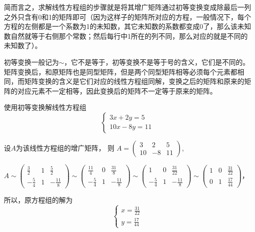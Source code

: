简而言之，求解线性方程组的步骤就是将其增广矩阵通过初等变换变成除最后一列之外只含有0和1的矩阵即可（因为这样子的矩阵所对应的方程，一般情况下，每个方程的左侧都是一个系数为1的未知数，其它未知数的系数都变成0了，那么该未知数自然就等于右侧那个常数；然后每行中1所在的列不同，那么对应的就是不同的未知数了）。

初等变换一般记为$\sim$，它不是等于，初等变换不是等于号的含义，它们是不同的。矩阵变换后，和原矩阵也是同型矩阵，但是两个同型矩阵相等必须每个元素都相同，而矩阵变换的含义是它们对应的线性方程组同解，变换之后的矩阵和原来的矩阵的对应元素不一定相等，因此变换后的矩阵不一定等于原来的矩阵。

\begin{example}
    使用初等变换解线性方程组
    \begin{equation}
        \begin{cases}
            3x+2y=5 \\
            10x-8y=11
        \end{cases}
    \end{equation}
\end{example}
\begin{solution}
    设$A$为该线性方程组的增广矩阵，
    则
    $A= \begin{pmatrix}
        3 & 2 & 5 \\ 
        10 & -8 & 11 
    \end{pmatrix}$,

    $A \sim
    \begin{pmatrix}
        \frac{3}{2} & 1 & \frac{5}{2} \\ 
        -\frac{5}{4} & 1 & -\frac{11}{8} 
    \end{pmatrix}
    \sim
    \begin{pmatrix}
        \frac{11}{4} & 0 & \frac{31}{8} \\ 
        -\frac{5}{4} & 1 & -\frac{11}{8} 
    \end{pmatrix}
    \sim
    \begin{pmatrix}
        1 & 0 & \frac{31}{22} \\ 
        -\frac{5}{4} & 1 & -\frac{11}{8} 
    \end{pmatrix}
    \sim
    \begin{pmatrix}
        1 & 0 & \frac{31}{22} \\ 
        0 & 1 & \frac{17}{44} 
    \end{pmatrix}
    $，
    
    所以，原方程组的解为
    \begin{equation}
        \begin{cases}
            x=\frac{31}{22} \\
            y=\frac{17}{44}
        \end{cases}
    \end{equation}
\end{solution}

